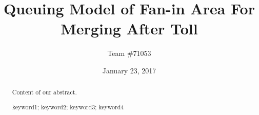 \documentclass[a4paper, 11pt]{article}
\title{Queuing Model of Fan-in Area For Merging After Toll}
\author{Team \#71053}
\date{January 23, 2017}
\begin{document}
\begin{abstract}
Content of our abstract.

\begin{keywords}
keyword1; keyword2; keyword3; keyword4
\end{keywords}

\end{abstract}

\maketitle
\pagestyle{empty}
\newpage
\tableofcontents

\pagestyle{fancy}

\end{document}
